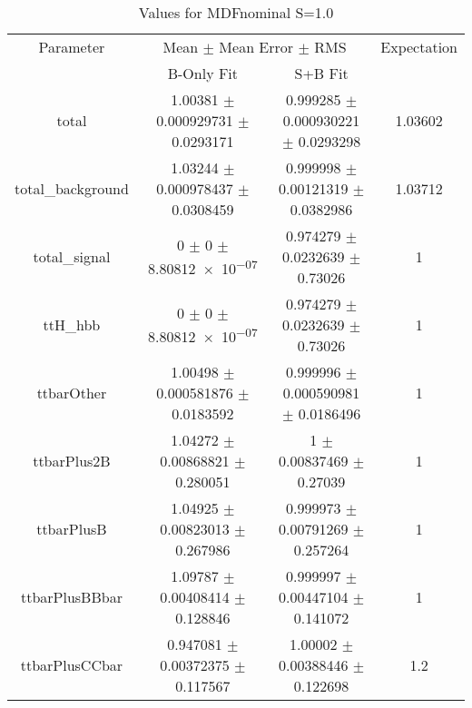 \begin{table}
\centering
\caption{Values for MDFnominal S=1.0}
\begin{tabular}{cccc}
\toprule
Parameter & \multicolumn{2}{c}{Mean $\pm$ Mean Error $\pm$ RMS} & Expectation\\
 & B-Only Fit & S+B Fit & \\
\midrule
total & \num{1.00381} $\pm$ \num{0.000929731} $\pm$ \num{0.0293171} & \num{0.999285} $\pm$ \num{0.000930221} $\pm$ \num{0.0293298} & \num{1.03602}\\
total\_background & \num{1.03244} $\pm$ \num{0.000978437} $\pm$ \num{0.0308459} & \num{0.999998} $\pm$ \num{0.00121319} $\pm$ \num{0.0382986} & \num{1.03712}\\
total\_signal & \num{0} $\pm$ \num{0} $\pm$ \num{8.80812e-07} & \num{0.974279} $\pm$ \num{0.0232639} $\pm$ \num{0.73026} & \num{1}\\
ttH\_hbb & \num{0} $\pm$ \num{0} $\pm$ \num{8.80812e-07} & \num{0.974279} $\pm$ \num{0.0232639} $\pm$ \num{0.73026} & \num{1}\\
ttbarOther & \num{1.00498} $\pm$ \num{0.000581876} $\pm$ \num{0.0183592} & \num{0.999996} $\pm$ \num{0.000590981} $\pm$ \num{0.0186496} & \num{1}\\
ttbarPlus2B & \num{1.04272} $\pm$ \num{0.00868821} $\pm$ \num{0.280051} & \num{1} $\pm$ \num{0.00837469} $\pm$ \num{0.27039} & \num{1}\\
ttbarPlusB & \num{1.04925} $\pm$ \num{0.00823013} $\pm$ \num{0.267986} & \num{0.999973} $\pm$ \num{0.00791269} $\pm$ \num{0.257264} & \num{1}\\
ttbarPlusBBbar & \num{1.09787} $\pm$ \num{0.00408414} $\pm$ \num{0.128846} & \num{0.999997} $\pm$ \num{0.00447104} $\pm$ \num{0.141072} & \num{1}\\
ttbarPlusCCbar & \num{0.947081} $\pm$ \num{0.00372375} $\pm$ \num{0.117567} & \num{1.00002} $\pm$ \num{0.00388446} $\pm$ \num{0.122698} & \num{1.2}\\
\bottomrule
\end{tabular}
\end{table}